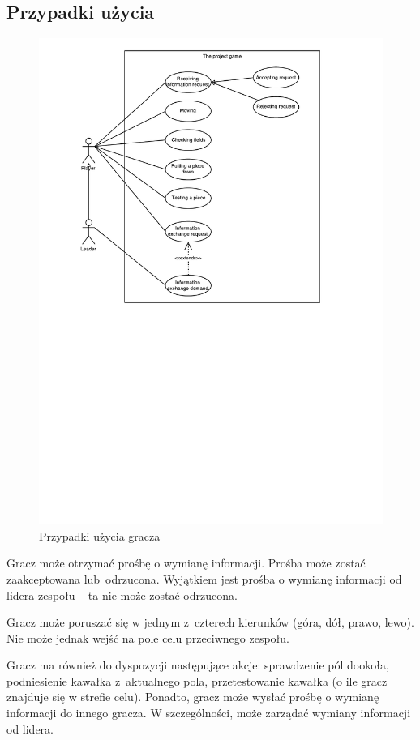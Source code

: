 \documentclass[a4paper]{article}
\begin{document}
\subsection*{Przypadki użycia}
\begin{figure}[H]
\caption{Przypadki użycia gracza}
\centering
\includegraphics[scale=0.9]{przypadki_uzycia_gracz_lider.pdf}
\end{figure}

Gracz może otrzymać prośbę o wymianę informacji.
Prośba może zostać zaakceptowana lub~odrzucona.
Wyjątkiem jest prośba o wymianę informacji od lidera zespołu -- ta nie może zostać odrzucona.

Gracz może poruszać się w jednym z~czterech kierunków (góra, dół, prawo, lewo).
Nie może jednak wejść na pole celu przeciwnego zespołu.

Gracz ma również do dyspozycji następujące akcje: sprawdzenie pól dookoła, podniesienie kawałka z~aktualnego pola, przetestowanie kawałka (o ile gracz znajduje się w strefie celu).
Ponadto, gracz może wysłać prośbę o wymianę informacji do innego gracza.
W szczególności, może zarządać wymiany informacji od lidera.
\end{document}
